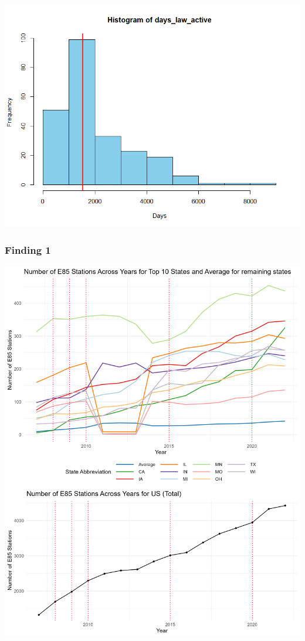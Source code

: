 \documentclass[
]{article}
\begin{document}
\includegraphics[width=6.25in,height=\textheight]{images/histogram.png}

\hypertarget{finding-1}{%
\subsubsection{Finding 1}\label{finding-1}}

\includegraphics[width=6.25in,height=\textheight]{images/e85_overtime_graph.png}
\end{document}
